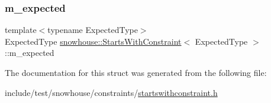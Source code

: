 \subsubsection{\texorpdfstring{m\_expected}{m\_expected}}
{\footnotesize\ttfamily template$<$typename Expected\+Type$>$ \\
Expected\+Type \mbox{\hyperlink{structsnowhouse_1_1StartsWithConstraint}{snowhouse\+::\+Starts\+With\+Constraint}}$<$ Expected\+Type $>$\+::m\+\_\+expected}



The documentation for this struct was generated from the following file\+:\begin{DoxyCompactItemize}
\item 
include/test/snowhouse/constraints/\mbox{\hyperlink{startswithconstraint_8h}{startswithconstraint.\+h}}\end{DoxyCompactItemize}
